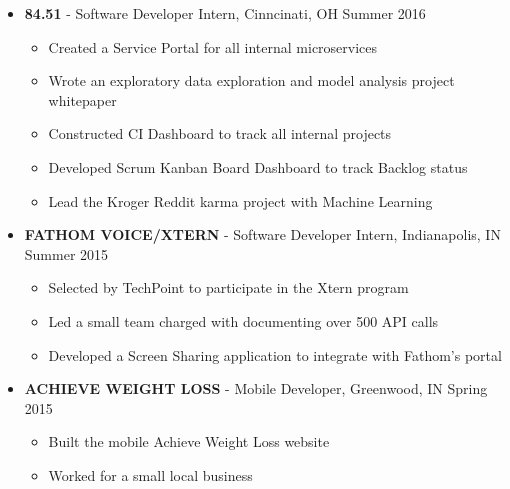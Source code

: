 \documentclass[10pt]{article} %
\begin{document}
\begin{itemize}
	\item[] \textbf{ 84.51\degree} - Software Developer Intern, Cinncinati, OH \hfill{Summer 2016}
	\begin{itemize}
		\item Created a Service Portal for all internal microservices
		\item Wrote an exploratory data exploration and model analysis project whitepaper
		\item Constructed CI Dashboard to track all internal projects
		\item Developed Scrum Kanban Board Dashboard to track Backlog status
		\item Lead the Kroger Reddit karma project with Machine Learning
	\end{itemize}
	\item[] \textbf{\small FATHOM VOICE/XTERN} - Software Developer Intern, Indianapolis, IN \hfill{Summer 2015}
	\begin{itemize}
		\item Selected by TechPoint to participate in the Xtern program
		\item Led a small team charged with documenting over 500 API calls
		\item Developed a Screen Sharing application to integrate with Fathom's portal
	\end{itemize}
	\item[] \textbf{\small ACHIEVE WEIGHT LOSS} - Mobile Developer, Greenwood, IN \hfill{Spring 2015}
	\begin{itemize}
		\item Built the mobile Achieve Weight Loss website
		\item Worked for a small local business 
	\end{itemize}
\end{itemize}
\end{document}
